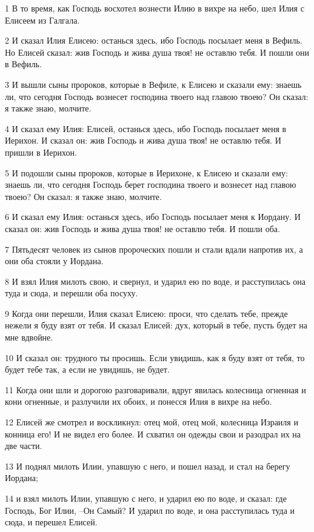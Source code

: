 \par 1 В то время, как Господь восхотел вознести Илию в вихре на небо, шел Илия с Елисеем из Галгала.
\par 2 И сказал Илия Елисею: останься здесь, ибо Господь посылает меня в Вефиль. Но Елисей сказал: жив Господь и жива душа твоя! не оставлю тебя. И пошли они в Вефиль.
\par 3 И вышли сыны пророков, которые в Вефиле, к Елисею и сказали ему: знаешь ли, что сегодня Господь вознесет господина твоего над главою твоею? Он сказал: я также знаю, молчите.
\par 4 И сказал ему Илия: Елисей, останься здесь, ибо Господь посылает меня в Иерихон. И сказал он: жив Господь и жива душа твоя! не оставлю тебя. И пришли в Иерихон.
\par 5 И подошли сыны пророков, которые в Иерихоне, к Елисею и сказали ему: знаешь ли, что сегодня Господь берет господина твоего и вознесет над главою твоею? Он сказал: я также знаю, молчите.
\par 6 И сказал ему Илия: останься здесь, ибо Господь посылает меня к Иордану. И сказал он: жив Господь и жива душа твоя! не оставлю тебя. И пошли оба.
\par 7 Пятьдесят человек из сынов пророческих пошли и стали вдали напротив их, а они оба стояли у Иордана.
\par 8 И взял Илия милоть свою, и свернул, и ударил ею по воде, и расступилась она туда и сюда, и перешли оба посуху.
\par 9 Когда они перешли, Илия сказал Елисею: проси, что сделать тебе, прежде нежели я буду взят от тебя. И сказал Елисей: дух, который в тебе, пусть будет на мне вдвойне.
\par 10 И сказал он: трудного ты просишь. Если увидишь, как я буду взят от тебя, то будет тебе так, а если не увидишь, не будет.
\par 11 Когда они шли и дорогою разговаривали, вдруг явилась колесница огненная и кони огненные, и разлучили их обоих, и понесся Илия в вихре на небо.
\par 12 Елисей же смотрел и воскликнул: отец мой, отец мой, колесница Израиля и конница его! И не видел его более. И схватил он одежды свои и разодрал их на две части.
\par 13 И поднял милоть Илии, упавшую с него, и пошел назад, и стал на берегу Иордана;
\par 14 и взял милоть Илии, упавшую с него, и ударил ею по воде, и сказал: где Господь, Бог Илии, --Он Самый? И ударил по воде, и она расступилась туда и сюда, и перешел Елисей.
